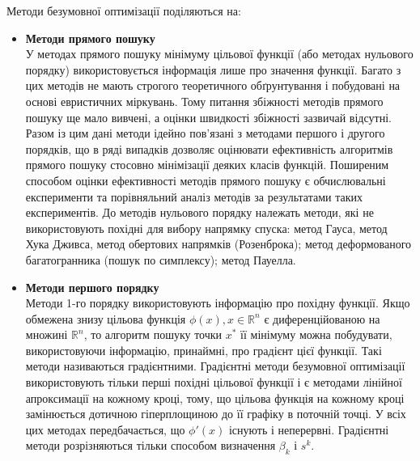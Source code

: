 Методи безумовної оптимізації поділяються на:
\begin{itemize}
	\item \textbf{Методи прямого пошуку}\\
	У методах прямого пошуку мінімуму цільової функції (або методах нульового порядку) використовується інформація лише про значення функції. Багато з цих методів не мають строгого теоретичного обґрунтування і побудовані на основі евристичних міркувань. Тому питання збіжності методів прямого пошуку ще мало вивчені, а оцінки швидкості збіжності зазвичай відсутні. Разом із цим дані методи ідейно пов'язані з методами першого і другого порядків, що в ряді випадків дозволяє оцінювати ефективність алгоритмів прямого пошуку стосовно мінімізації деяких класів функцій. Поширеним способом оцінки ефективності методів прямого пошуку є обчислювальні експерименти та порівняльний аналіз методів за результатами таких експериментів.
	 До методів нульового порядку належать методи, які не використовують похідні для вибору напрямку спуска: метод Гауса, метод Хука Дживса, метод обертових напрямків (Розенброка); метод деформованого багатогранника (пошук по симплексу); метод Пауелла.
	\item \textbf{Методи першого порядку}\\
	Методи 1-го порядку використовують інформацію про похідну функції. Якщо обмежена знизу цільова функція $\phi(x), x \in \mathbb{R}^n$ є диференційованою на множині $\mathbb{R}^n$, то алгоритм пошуку точки $x^*$ її мінімуму можна побудувати, використовуючи інформацію, принаймні, про градієнт цієї функції. Такі методи називаються градієнтними. Градієнтні методи безумовної оптимізації використовують тільки перші похідні цільової функції і є методами лінійної апроксимації на кожному кроці, тому, що цільова функція на кожному кроці замінюється дотичною гіперплощиною до її графіку в поточній точці.
	У всіх цих методах передбачається, що $\phi'(x)$ існують і неперервні. Градієнтні методи розрізняються тільки способом визначення $\beta_k$ і $s^k$. 
	

\end{itemize}
